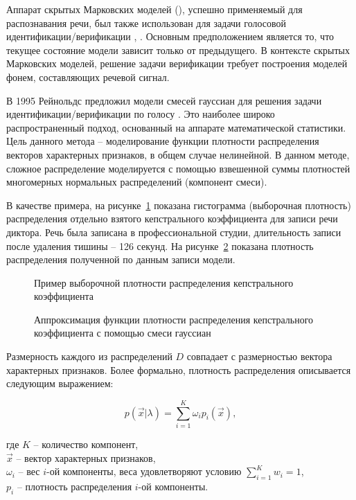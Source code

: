 Аппарат скрытых Марковских моделей (), успешно применяемый для распознавания речи, был также использован для задачи голосовой идентификации/верификации \cite{Olsson02hmmann}, \cite{Falavigna_comparisonof}. Основным предположением является то, что текущее состояние модели зависит только от предыдущего. В контексте скрытых Марковских моделей, решение задачи верификации требует построения моделей фонем, составляющих речевой сигнал.

В 1995 Рейнольдс предложил модели смесей гауссиан для решения задачи идентификации/верификации по голосу \cite{Reynolds95gmm}. Это наиболее широко распространенный подход, основанный на аппарате математической статистики. Цель данного метода -- моделирование функции плотности распределения векторов характерных признаков, в общем случае нелинейной. В данном методе, сложное распределение моделируется с помощью взвешенной суммы плотностей многомерных нормальных распределений (компонент смеси).

В качестве примера, на рисунке~\ref{fig:gmm_hist} показана гистограмма (выборочная плотность) распределения отдельно взятого кепстрального коэффициента для записи речи диктора. Речь была записана в профессиональной студии, длительность записи после удаления тишины -- 126 секунд. На рисунке~\ref{fig:gmm_pdf} показана плотность распределения полученной по данным записи модели.

\begin{figure}[t!]
\caption{Пример выборочной плотности распределения кепстрального коэффициента}
\label{fig:gmm_hist}
\end{figure}
\begin{figure}[h!]
\caption{Аппроксимация функции плотности распределения кепстрального коэффициента с помощью смеси гауссиан}
\label{fig:gmm_pdf}
\end{figure}

Размерность каждого из распределений $D$ совпадает с размерностью вектора характерных признаков. Более формально, плотность распределения описывается следующим выражением:

\begin{equation}
p(\vec x | \lambda) = \sum_{i=1}^K{\omega_i p_i(\vec x)},
\end{equation}

\noindent где $K$ -- количество компонент,\\
$\vec x$ -- вектор характерных признаков,\\
$\omega_i$ -- вес $i$-ой компоненты, веса удовлетворяют условию $\sum_{i=1}^K w_i = 1$,\\
$p_i$ -- плотность распределения $i$-ой компоненты.

